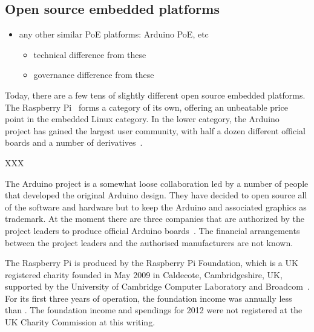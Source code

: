 \documentclass[final]{siamltex}
\begin{document}
\subsection{Open source embedded platforms}

\begin{itemize}
  \item any other similar PoE platforms: Arduino PoE, etc
    \begin{itemize}
    \item technical difference from these
    \item governance difference from these
    \end{itemize}
\end{itemize}

Today, there are a few tens of slightly different open source embedded
platforms.  The Raspberry Pi~\cite{RasPi} forms a category of its own,
offering an unbeatable price point in the embedded Linux category.  In
the lower category, the Arduino~\cite{ArduinoProject,hribernik2011co}
project has gained the largest user community, with half a dozen
different official boards and a number of derivatives~\cite{XXX}.

XXX

The Arduino project is a somewhat loose collaboration led by a number of
people that developed the original Arduino design.  They have decided
to open source all of the software and hardware but to keep the
Arduino and associated graphics as trademark.  At the moment there are
three companies that are authorized by the project leaders to produce
official Arduino boards~\cite{ArduinoPolicy}.  The financial
arrangements between the project leaders and the authorised
manufacturers are not known.

The Raspberry Pi is produced by the Raspberry Pi Foundation, which is
a UK registered charity founded in May 2009 in Caldecote,
Cambridgeshire, UK, supported by the University of Cambridge Computer
Laboratory and Broadcom~\cite{RaspiFoundationWikipedia}.  For its
first three years of operation, the foundation income was annually
less than .  The foundation income and spendings for 2012
were not registered at the UK Charity Commission at this writing.
\end{document}
